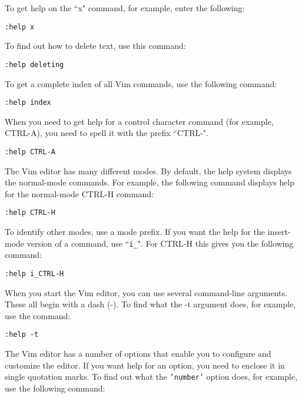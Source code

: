 To get help on the ``x" command, for example, enter the following:

 \begin{Verbatim}[samepage=true]
 :help x
 \end{Verbatim}

To find out how to delete text, use this command:

 \begin{Verbatim}[samepage=true]
 :help deleting
 \end{Verbatim}

To get a complete index of all Vim commands, use the following command:

 \begin{Verbatim}[samepage=true]
 :help index
 \end{Verbatim}

When you need to get help for a control character command (for example, CTRL-A), you need to spell it with the prefix ``CTRL-".

 \begin{Verbatim}[samepage=true]
 :help CTRL-A
 \end{Verbatim}

The Vim editor has many different modes.
By default, the help system displays the normal-mode commands.
For example, the following command displays help for the normal-mode CTRL-H command: 

 \begin{Verbatim}[samepage=true]
 :help CTRL-H
 \end{Verbatim}

To identify other modes, use a mode prefix.
If you want the help for the insert-mode version of a command, use ``\texttt{i\_}".
For CTRL-H this gives you the following command: 

 \begin{Verbatim}[samepage=true]
 :help i_CTRL-H
 \end{Verbatim}

When you start the Vim editor, you can use several command-line arguments.
These all begin with a dash (-).
To find what the -t argument does, for example, use the command: 

 \begin{Verbatim}[samepage=true]
 :help -t
 \end{Verbatim}

The Vim editor has a number of options that enable you to configure and customize the editor.
If you want help for an option, you need to enclose it in single quotation marks.
To find out what the \texttt{'number'} option does, for example, use the following command: 

